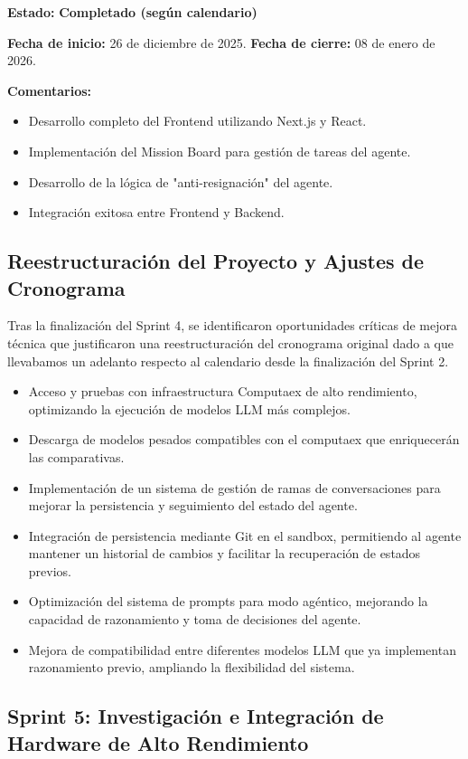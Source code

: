 \documentclass[12pt,a4paper]{article}
\begin{document}
\textbf{Estado:} \textcolor{ontime}{\textbf{Completado (según calendario)}}

\textbf{Fecha de inicio:} 26 de diciembre de 2025.
\textbf{Fecha de cierre:} 08 de enero de 2026.

\textbf{Comentarios:}
\begin{itemize}
    \item Desarrollo completo del Frontend utilizando Next.js y React.
    \item Implementación del Mission Board para gestión de tareas del agente.
    \item Desarrollo de la lógica de "anti-resignación" del agente.
    \item Integración exitosa entre Frontend y Backend.
\end{itemize}

\subsection{Reestructuración del Proyecto y Ajustes de Cronograma}
Tras la finalización del Sprint 4, se identificaron oportunidades críticas de mejora técnica que justificaron una reestructuración del cronograma original dado a que llevabamos un adelanto respecto al calendario desde la finalización del Sprint 2.
\begin{itemize}
    \item Acceso y pruebas con infraestructura Computaex de alto rendimiento, optimizando la ejecución de modelos LLM más complejos.
    \item Descarga de modelos pesados compatibles con el computaex que enriquecerán las comparativas.
    \item Implementación de un sistema de gestión de ramas de conversaciones para mejorar la persistencia y seguimiento del estado del agente.
    \item Integración de persistencia mediante Git en el sandbox, permitiendo al agente mantener un historial de cambios y facilitar la recuperación de estados previos.
    \item Optimización del sistema de prompts para modo agéntico, mejorando la capacidad de razonamiento y toma de decisiones del agente.
    \item Mejora de compatibilidad entre diferentes modelos LLM que ya implementan razonamiento previo, ampliando la flexibilidad del sistema.
\end{itemize}
\subsection{Sprint 5: Investigación e Integración de Hardware de Alto Rendimiento}
\end{document}
